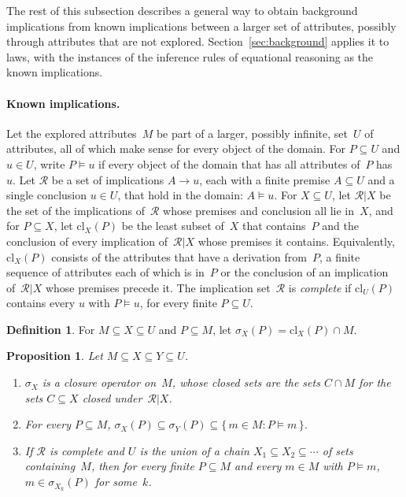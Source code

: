 \documentclass[11pt,a4paper]{article}
\newtheorem{proposition}{Proposition}
\theoremstyle{definition}
\newtheorem{definition}{Definition}
\theoremstyle{remark}
\begin{document}
The rest of this subsection describes a general way to obtain background implications from known implications between a larger set of attributes, possibly through attributes that are not explored. Section~\ref{sec:background} applies it to laws, with the instances of the inference rules of equational reasoning as the known implications.

\paragraph{Known implications.}
Let the explored attributes~$M$ be part of a larger, possibly infinite, set~$U$ of attributes, all of which make sense for every object of the domain. For $P \subseteq U$ and $u \in U$, write $P \models u$ if every object of the domain that has all attributes of~$P$ has~$u$. Let $\mathcal{R}$ be a set of implications $A \to u$, each with a finite premise $A \subseteq U$ and a single conclusion $u \in U$, that hold in the domain: $A \models u$. For $X \subseteq U$, let $\mathcal{R}|X$ be the set of the implications of~$\mathcal{R}$ whose premises and conclusion all lie in~$X$, and for $P \subseteq X$, let $\mathrm{cl}_X(P)$ be the least subset of~$X$ that contains~$P$ and the conclusion of every implication of~$\mathcal{R}|X$ whose premises it contains. Equivalently, $\mathrm{cl}_X(P)$ consists of the attributes that have a derivation from~$P$, a finite sequence of attributes each of which is in~$P$ or the conclusion of an implication of~$\mathcal{R}|X$ whose premises precede it. The implication set~$\mathcal{R}$ is \emph{complete} if $\mathrm{cl}_U(P)$ contains every $u$ with $P \models u$, for every finite $P \subseteq U$.

\begin{definition}
For $M \subseteq X \subseteq U$ and $P \subseteq M$, let $\sigma_X(P) = \mathrm{cl}_X(P) \cap M$.
\end{definition}

\begin{proposition}\label{prop:trace}
Let $M \subseteq X \subseteq Y \subseteq U$.
\begin{enumerate}
  \item $\sigma_X$ is a closure operator on~$M$, whose closed sets are the sets $C \cap M$ for the sets $C \subseteq X$ closed under~$\mathcal{R}|X$.
  \item For every $P \subseteq M$, $\sigma_X(P) \subseteq \sigma_Y(P) \subseteq \{\, m \in M : P \models m \,\}$.
  \item If $\mathcal{R}$ is complete and $U$ is the union of a chain $X_1 \subseteq X_2 \subseteq \cdots$ of sets containing~$M$, then for every finite $P \subseteq M$ and every $m \in M$ with $P \models m$, $m \in \sigma_{X_k}(P)$ for some~$k$.
\end{enumerate}
\end{proposition}
\end{document}
